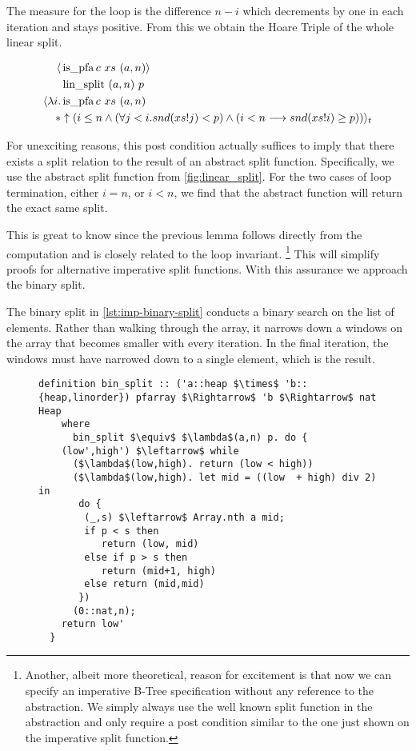 The measure for the loop is the difference $n-i$ which
decrements by one in each iteration and stays positive.
From this we obtain the Hoare Triple of the whole linear split.

\begin{lemma}
    \begin{align*}
        \langle &\operatorname{is\_pfa} c\ xs\ (a,n)\rangle \\
                  &\operatorname{lin\_split}\ (a,n)\ p \\
        \langle \lambda i. & \operatorname{is\_pfa} c\ xs\ (a,n) \\
        * &\uparrow(i \leq n 
            \wedge (\forall j < i. snd (xs!j) < p) 
            \wedge (i<n \longrightarrow snd (xs!i) \geq p)) \rangle_t 
    \end{align*}
\end{lemma}

For unexciting reasons, this post condition
actually suffices to imply that there exists a split relation
to the result of an abstract split function.
Specifically, we use the abstract split function from
\autoref{fig:linear_split}. %
For the two cases of loop termination,
either $i = n$, or $i < n$, we find that
the abstract function will return the exact same split.

This is great to know since the previous lemma
follows directly from the computation and is closely related
to the loop invariant.
\footnote{Another, albeit more theoretical,
reason for excitement is that now we can specify an imperative B-Tree
specification without any reference to the abstraction.
We simply always use the well known split function in the abstraction
and only require a post condition similar to the one just shown
on the imperative split function.}
This will simplify proofs for alternative imperative split functions.
With this assurance we approach the binary split.

The binary split in \autoref{lst:imp-binary-split} conducts a binary search on
the list of elements.
Rather than walking through the array,
it narrows down a windows on the array that becomes smaller with
every iteration.
In the final iteration,
the windows must have narrowed down to a single element,
which is the result.

\begin{figure}
\begin{lstlisting}[mathescape=true, language=Isabelle, caption={The imperative binary split},
    label={lst:imp-binary-split}]
    definition bin_split :: ('a::heap $\times$ 'b::{heap,linorder}) pfarray $\Rightarrow$ 'b $\Rightarrow$ nat Heap 
    where 
      bin_split $\equiv$ $\lambda$(a,n) p. do { 
    (low',high') $\leftarrow$ while  
      ($\lambda$(low,high). return (low < high))  
      ($\lambda$(low,high). let mid = ((low  + high) div 2) in 
       do { 
        (_,s) $\leftarrow$ Array.nth a mid; 
        if p < s then 
           return (low, mid) 
        else if p > s then 
           return (mid+1, high) 
        else return (mid,mid) 
       })  
      (0::nat,n); 
    return low' 
  }
\end{lstlisting}
\end{figure}

